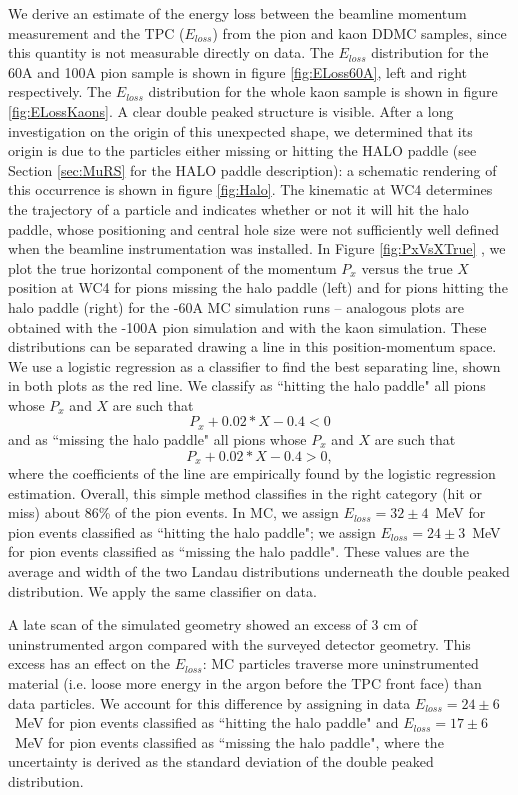 We derive an estimate of the energy loss between the beamline momentum measurement and the TPC ($E_{loss}$) from the pion and kaon DDMC samples, since this quantity is not  measurable directly on data. 
The $E_{loss}$ distribution for the 60A  and 100A pion sample is shown in figure \ref{fig:ELoss60A}, left and right respectively. The $E_{loss}$ distribution for the  whole kaon sample is shown in figure \ref{fig:ELossKaons}. A clear double peaked structure is visible. After a long investigation on the origin of this unexpected shape, we determined that its origin is due to the particles either missing or hitting the HALO paddle (see Section \ref{sec:MuRS} for the HALO paddle description): a schematic rendering of this occurrence is  shown in figure \ref{fig:Halo}. The kinematic at WC4 determines the trajectory of a particle and indicates whether or not it will hit the halo paddle, whose positioning and central hole size were not sufficiently well defined when the beamline instrumentation was installed. In Figure \ref{fig:PxVsXTrue} , we plot the true  horizontal component of the momentum $P_x$ versus the true $X$ position at WC4 for pions missing the halo paddle (left) and for pions hitting the halo paddle (right) for the -60A MC simulation runs -- analogous plots are obtained with the -100A pion simulation and with the kaon simulation. These distributions can be separated drawing a line in this position-momentum space. 
We use a logistic regression  \cite{agresti2013categorical}  as a classifier to find the best separating line, shown in both plots as the red line. We classify as ``hitting the halo paddle" all pions whose $P_x$ and $X$ are such that $$P_x +0.02* X - 0.4 < 0 $$ and as ``missing the halo  paddle" all pions whose $P_x$ and $X$ are such that $$P_x +0.02*X - 0.4 > 0, $$ where the coefficients of the line are empirically found by the logistic regression estimation. Overall, this simple method classifies in the right category (hit or miss) about 86\% of the pion events. In MC, we assign  $E_{loss} = 32 \pm 4 $~MeV for pion events classified as ``hitting the halo paddle"; we assign  $E_{loss} = 24 \pm 3 $~MeV for pion events classified as ``missing the halo paddle". These values are the average and width of the two Landau distributions underneath the double peaked distribution. We apply the same classifier on data. 

A late scan of the simulated geometry showed an excess of 3 cm of uninstrumented argon compared with the surveyed detector geometry. This excess has an effect on the $E_{loss}$: MC particles traverse more uninstrumented material  (i.e. loose more energy in the argon before the TPC front face) than data particles.
We account for this difference by assigning in data $E_{loss} = 24 \pm 6 $~MeV for pion events classified as ``hitting the halo paddle" and  $E_{loss} = 17 \pm 6 $~MeV for pion events classified as ``missing the halo paddle", where the uncertainty is derived as the standard deviation of the double peaked distribution.

